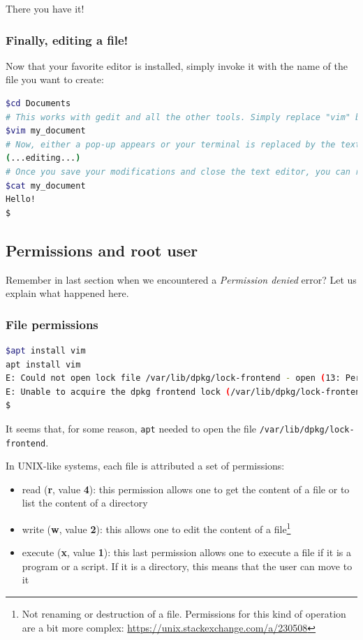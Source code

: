 \documentclass[12pt]{article}
\begin{document}
There you have it!

\subsubsection{Finally, editing a file!}


Now that your favorite editor is installed, simply invoke it with the name of the file you want to create:

\begin{lstlisting}[language=bash]
$cd Documents
# This works with gedit and all the other tools. Simply replace "vim" by the name of your text editor
$vim my_document
# Now, either a pop-up appears or your terminal is replaced by the text editor. In most cases you CANNOT use your terminal until the text editor is closed
(...editing...)
# Once you save your modifications and close the text editor, you can re-use your terminal
$cat my_document 
Hello!
$
\end{lstlisting}


\subsection{Permissions and root user}

Remember in last section when we encountered a \textit{Permission denied} error? Let us explain what happened here.

\subsubsection{File permissions}

\begin{lstlisting}[language=bash]
$apt install vim
apt install vim
E: Could not open lock file /var/lib/dpkg/lock-frontend - open (13: Permission denied)
E: Unable to acquire the dpkg frontend lock (/var/lib/dpkg/lock-frontend), are you root?
$
\end{lstlisting}

It seems that, for some reason, \texttt{apt} needed to open the file \texttt{/var/lib/dpkg/lock-frontend}.

In UNIX-like systems, each file is attributed a set of permissions:
\begin{itemize}
	\item read (\textbf{r}, value \textbf{4}): this permission allows one to get the content of a file or to list the content of a directory
	\item write (\textbf{w}, value \textbf{2}): this allows one to edit the content of a file\footnote{Not renaming or destruction of a file. Permissions for this kind of operation are a bit more complex: \url{https://unix.stackexchange.com/a/230508}}
	\item execute (\textbf{x}, value \textbf{1}): this last permission allows one to execute a file if it is a program or a script. If it is a directory, this means that the user can move to it
\end{itemize}
\end{document}
